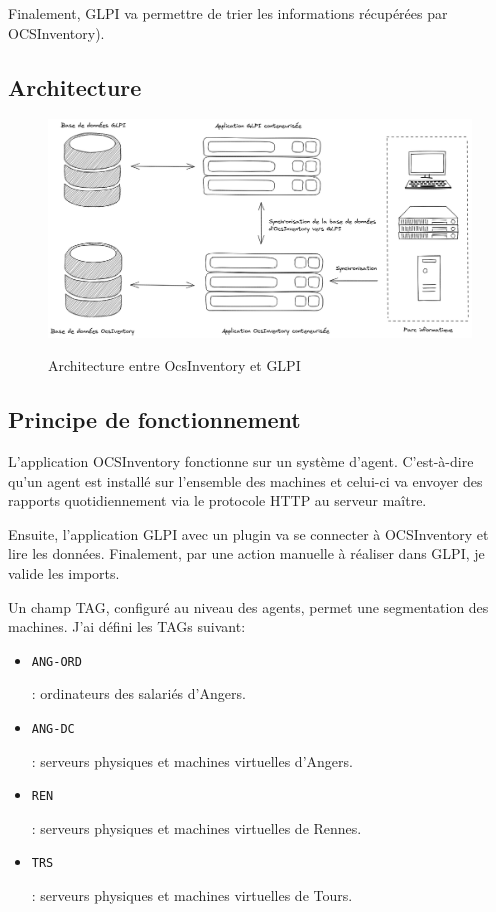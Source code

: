 \documentclass[12pt, a4paper, twoside]{article}
\begin{document}
Finalement, \gls{GLPI} va permettre de trier les informations récupérées par \gls{OCSInventory}).

\subsection{Architecture}
\begin{figure}[!ht]
    \centering
    \includegraphics[width=\textwidth]{src/graph_glpi.png}
    \label{fig:glpi}
    \caption{Architecture entre OcsInventory et \gls{GLPI}}
\end{figure}

\newpage
\subsection{Principe de fonctionnement}
L'application \gls{OCSInventory} fonctionne sur un système d'agent.
C'est-à-dire qu'un agent est installé sur l'ensemble des machines et celui-ci va envoyer des rapports quotidiennement via le protocole HTTP au serveur maître. 

Ensuite, l'application \gls{GLPI} avec un plugin va se connecter à \gls{OCSInventory} et lire les données.
Finalement, par une action manuelle à réaliser dans \gls{GLPI}, je valide les imports.

Un champ TAG, configuré au niveau des agents, permet une segmentation des machines.
J'ai défini les TAGs suivant:
\begin{itemize}
    \item \begin{code}\texttt{ANG-ORD}\end{code}: ordinateurs des salariés d'Angers.
    \item \begin{code}\texttt{ANG-DC}\end{code}: serveurs physiques et machines virtuelles d'Angers.
    \item \begin{code}\texttt{REN}\end{code}: serveurs physiques et machines virtuelles de Rennes.
    \item \begin{code}\texttt{TRS}\end{code}: serveurs physiques et machines virtuelles de Tours.
\end{itemize}
\end{document}

